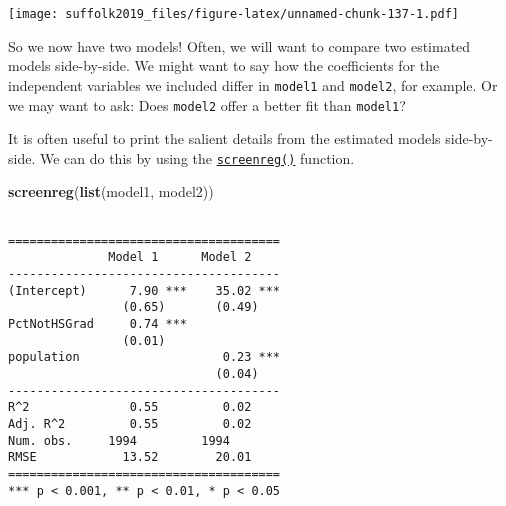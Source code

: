 \documentclass[]{article}
\newenvironment{Shaded}{\begin{snugshade}}{\end{snugshade}}
\newcommand{\DataTypeTok}[1]{\textcolor[rgb]{0.13,0.29,0.53}{#1}}
\newcommand{\DecValTok}[1]{\textcolor[rgb]{0.00,0.00,0.81}{#1}}
\newcommand{\KeywordTok}[1]{\textcolor[rgb]{0.13,0.29,0.53}{\textbf{#1}}}
\newcommand{\NormalTok}[1]{#1}
\newcommand{\OperatorTok}[1]{\textcolor[rgb]{0.81,0.36,0.00}{\textbf{#1}}}
\newcommand{\OtherTok}[1]{\textcolor[rgb]{0.56,0.35,0.01}{#1}}
\newcommand{\StringTok}[1]{\textcolor[rgb]{0.31,0.60,0.02}{#1}}
\begin{document}
\begin{Shaded}
\end{Shaded}

\texttt{[image: suffolk2019\_files/figure-latex/unnamed-chunk-137-1.pdf]}

So we now have two models! Often, we will want to compare two estimated models side-by-side. We might want to say how the coefficients for the independent variables we included differ in \texttt{model1} and \texttt{model2}, for example. Or we may want to ask: Does \texttt{model2} offer a better fit than \texttt{model1}?

It is often useful to print the salient details from the estimated models side-by-side. We can do this by using the \href{http://bit.ly/R_texreg}{\texttt{screenreg()}} function.

\begin{Shaded}
\begin{Highlighting}[]
\KeywordTok{screenreg}\NormalTok{(}\KeywordTok{list}\NormalTok{(model1, model2))}
\end{Highlighting}
\end{Shaded}

\begin{verbatim}

======================================
              Model 1      Model 2    
--------------------------------------
(Intercept)      7.90 ***    35.02 ***
                (0.65)       (0.49)   
PctNotHSGrad     0.74 ***             
                (0.01)                
population                    0.23 ***
                             (0.04)   
--------------------------------------
R^2              0.55         0.02    
Adj. R^2         0.55         0.02    
Num. obs.     1994         1994       
RMSE            13.52        20.01    
======================================
*** p < 0.001, ** p < 0.01, * p < 0.05
\end{verbatim}
\end{document}
